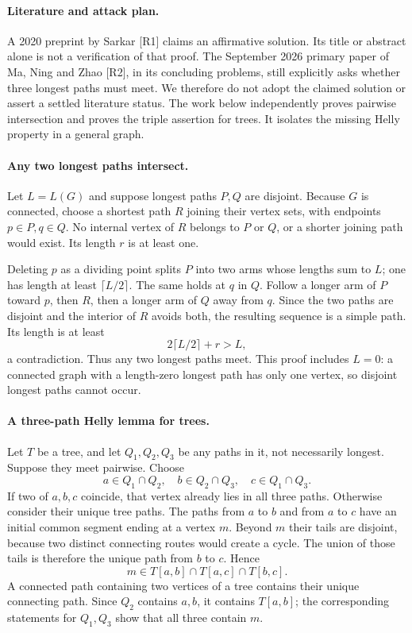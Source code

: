 \documentclass[11pt,a4paper]{article}
\begin{document}
\paragraph{Literature and attack plan.}
A 2020 preprint by Sarkar [R1] claims an affirmative solution. Its title or abstract alone is not a verification of that proof. The September 2026 primary paper of Ma, Ning and Zhao [R2], in its concluding problems, still explicitly asks whether three longest paths must meet. We therefore do not adopt the claimed solution or assert a settled literature status. The work below independently proves pairwise intersection and proves the triple assertion for trees. It isolates the missing Helly property in a general graph.

\paragraph{Any two longest paths intersect.}
Let $L=L(G)$ and suppose longest paths $P,Q$ are disjoint. Because $G$ is connected, choose a shortest path $R$ joining their vertex sets, with endpoints $p\in P,q\in Q$. No internal vertex of $R$ belongs to $P$ or $Q$, or a shorter joining path would exist. Its length $r$ is at least one.

Deleting $p$ as a dividing point splits $P$ into two arms whose lengths sum to $L$; one has length at least $\lceil L/2\rceil$. The same holds at $q$ in $Q$. Follow a longer arm of $P$ toward $p$, then $R$, then a longer arm of $Q$ away from $q$. Since the two paths are disjoint and the interior of $R$ avoids both, the resulting sequence is a simple path. Its length is at least
\[
 2\lceil L/2\rceil+r>L,
\]
a contradiction. Thus any two longest paths meet. This proof includes $L=0$: a connected graph with a length-zero longest path has only one vertex, so disjoint longest paths cannot occur.

\paragraph{A three-path Helly lemma for trees.}
Let $T$ be a tree, and let $Q_1,Q_2,Q_3$ be any paths in it, not necessarily longest. Suppose they meet pairwise. Choose
\[
 a\in Q_1\cap Q_2,\quad b\in Q_2\cap Q_3,
 \quad c\in Q_1\cap Q_3.
\]
If two of $a,b,c$ coincide, that vertex already lies in all three paths. Otherwise consider their unique tree paths. The paths from $a$ to $b$ and from $a$ to $c$ have an initial common segment ending at a vertex $m$. Beyond $m$ their tails are disjoint, because two distinct connecting routes would create a cycle. The union of those tails is therefore the unique path from $b$ to $c$. Hence
\[
 m\in T[a,b]\cap T[a,c]\cap T[b,c].
\]
A connected path containing two vertices of a tree contains their unique connecting path. Since $Q_2$ contains $a,b$, it contains $T[a,b]$; the corresponding statements for $Q_1,Q_3$ show that all three contain $m$.
\end{document}
